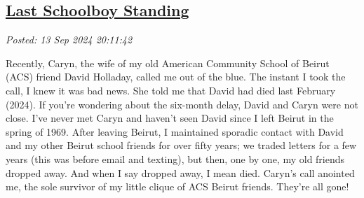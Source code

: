 %

%
%
%

\subsection*{\href{http://analyzethedatanotthedrivel.org/2024/09/13/last-schoolboy-standing/}{Last Schoolboy Standing}}


\noindent\emph{Posted: 13 Sep 2024 20:11:42}
\vspace{6pt}

Recently, Caryn, the wife of my old American Community School of Beirut
(ACS) friend David Holladay, called me out of the blue. The instant I
took the call, I knew it was bad news. She told me that David had died
last February (2024). If you're wondering about the six-month delay,
David and Caryn were not close. I've never met Caryn and haven't seen
David since I left Beirut in the spring of 1969. After leaving Beirut, I
maintained sporadic contact with David and my other Beirut school
friends for over fifty years; we traded letters for a few years (this
was before email and texting), but then, one by one, my old friends
dropped away. And when I say dropped away, I mean died. Caryn's call
anointed me, the sole survivor of my little clique of ACS Beirut
friends. They're all gone!

